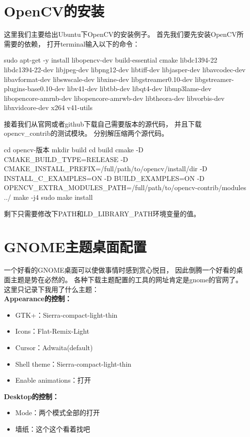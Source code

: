 \section{OpenCV的安装}
这里我们主要给出Ubuntu下OpenCV的安装例子。%
首先我们要先安装OpenCV所需要的依赖，%
打开terminal输入以下的命令：
\begin{bashcode}
  sudo apt-get -y install libopencv-dev build-essential cmake libdc1394-22 libdc1394-22-dev libjpeg-dev libpng12-dev libtiff-dev libjasper-dev libavcodec-dev libavformat-dev libswscale-dev libxine-dev libgstreamer0.10-dev libgstreamer-plugins-base0.10-dev libv41-dev libtbb-dev libqt4-dev libmp3lame-dev libopencore-amrnb-dev libopencore-amrwb-dev libtheora-dev libvorbis-dev libxvidcore-dev x264 v41-utils
\end{bashcode}

接着我们从官网或者github下载自己需要版本的源代码，%
并且下载opencv\_contrib的测试模块。%
分别解压缩两个源代码。%
\begin{bashcode}
  cd opencv-版本
  mkdir build
  cd build
  cmake -D CMAKE_BUILD_TYPE=RELEASE -D CMAKE_INSTALL_PREFIX=/full/path/to/opencv/install/dir -D INSTALL_C_EXAMPLES=ON -D BUILD_EXAMPLES=ON -D OPENCV_EXTRA_MODULES_PATH=/full/path/to/opencv-contrib/modules ../
  make -j4
  sudo make install
\end{bashcode}
 剩下只需要修改下PATH和LD\_LIBRARY\_PATH环境变量的值。


\section{GNOME主题桌面配置}
一个好看的GNOME桌面可以使做事情时感到赏心悦目，%
因此倒腾一个好看的桌面主题是势在必然的。%
各种下载主题配置的工具的网址肯定是gnome的官网了。%
这里只记录下我用了什么主题：\\
\noindent{}\textbf{\color{magenta}Appearance的控制：}
\begin{itemize}
\item{GTK+：Sierra-compact-light-thin}
\item{Icons：Flat-Remix-Light}
\item{Cursor：Adwaita(default)}
\item{Shell theme：Sierra-compact-light-thin}
\item{Enable animations：打开}
\end{itemize}

\noindent{}\textbf{\color{magenta}Desktop的控制：}
\begin{itemize}
\item{Mode：两个模式全部的打开}
\item{墙纸：这个这个看着找吧}
\end{itemize}

